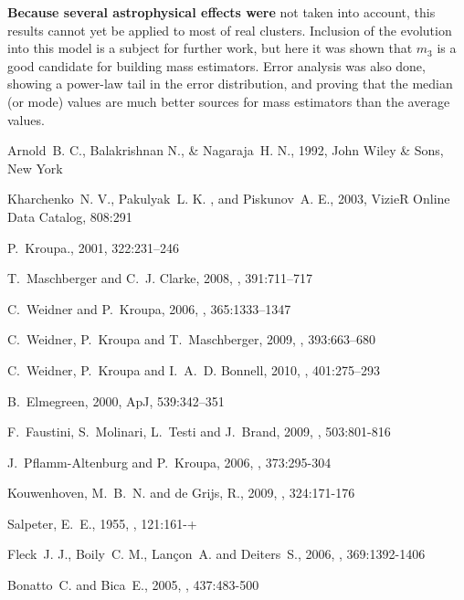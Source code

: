 \documentclass{aastex}
\begin{document}
\textbf{Because several astrophysical effects were }not taken into account, this results cannot yet be applied to most of real clusters. Inclusion
of the evolution into this model is a subject for further work, but here it was shown that $m_3$ is a good candidate for building 
mass estimators. Error analysis was also done, showing a power-law tail in the error distribution, and proving that the median (or mode) values 
are much better sources for mass estimators than the average values.

%
%
%
\begin{thebibliography}{1}

{Arnold}~B. C., {Balakrishnan} N., \& {Nagaraja}~H. N., 1992, John Wiley \& Sons, New York

{Kharchenko}~N. V., {Pakulyak}~L. K. , and {Piskunov}~A. E., 2003, VizieR Online Data Catalog, 808:291

P.~{Kroupa}.\mnras, 2001, 322:231--246

T.~{Maschberger} and C.~J. {Clarke}, 2008, \mnras, 391:711--717

C.~{Weidner} and P.~{Kroupa}, 2006, \mnras, 365:1333--1347

C.~{Weidner}, P.~{Kroupa} and T.~{Maschberger}, 2009, \mnras, 393:663--680

C.~{Weidner}, P.~{Kroupa} and I.~A.~D. {Bonnell}, 2010, \mnras, 401:275--293

B.~{Elmegreen}, 2000, ApJ, 539:342--351

F.~{Faustini}, S.~{Molinari}, L.~{Testi} and J.~{Brand}, 2009, \aap, 503:801-816

J.~{Pflamm-Altenburg} and P.~{Kroupa}, 2006, \mnras, 373:295-304

{Kouwenhoven}, M.~B.~N. and {de Grijs}, R., 2009, \apss, 324:171-176

{Salpeter}, E.~E., 1955, \apj, 121:161-+

{Fleck}~J. J., {Boily}~C. M., {Lan\c{c}on}~A. and {Deiters}~S., 2006, \mnras, 369:1392-1406

{Bonatto}~C. and {Bica}~E., 2005, \aap, 437:483-500
\end{thebibliography}
\end{document}
